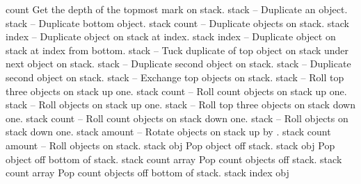 \begin{longtable}{}
	{count}
	{Get the depth of the topmost mark on stack.}
\hline
\optableent
	{stack}
	{{\bf {}}}
	{--}
	{Duplicate an object.}
\hline
\optableent
	{stack}
	{{\bf {}}}
	{--}
	{Duplicate bottom object.}
\hline
\optableent
	{stack count}
	{{\bf {}}}
	{--}
	{Duplicate objects on stack.}
\hline
\optableent
	{stack index}
	{{\bf {}}}
	{--}
	{Duplicate object on stack at index.}
\hline
\optableent
	{stack index}
	{{\bf {}}}
	{--}
	{Duplicate object on stack at index from bottom.}
\hline
\optableent
	{stack}
	{{\bf {}}}
	{--}
	{Tuck duplicate of top object on stack under next object on stack.}
\hline
\optableent
	{stack}
	{{\bf {}}}
	{--}
	{Duplicate second object on stack.}
\hline
\optableent
	{stack}
	{{\bf {}}}
	{--}
	{Duplicate second object on stack.}
\hline
\optableent
	{stack}
	{{\bf {}}}
	{--}
	{Exchange top objects on stack.}
\hline
\optableent
	{stack}
	{{\bf {}}}
	{--}
	{Roll top three objects on stack up one.}
\hline
\optableent
	{stack count}
	{{\bf {}}}
	{--}
	{Roll count objects on stack up one.}
\hline
\optableent
	{stack}
	{{\bf {}}}
	{--}
	{Roll objects on stack up one.}
\hline
\optableent
	{stack}
	{{\bf {}}}
	{--}
	{Roll top three objects on stack down one.}
\hline
\optableent
	{stack count}
	{{\bf {}}}
	{--}
	{Roll count objects on stack down one.}
\hline
\optableent
	{stack}
	{{\bf {}}}
	{--}
	{Roll objects on stack down one.}
\hline
\optableent
	{stack amount}
	{{\bf {}}}
	{--}
	{Rotate objects on stack up by .}
\hline
\optableent
	{stack count amount}
	{{\bf {}}}
	{--}
	{Roll objects on stack.}
\hline
\optableent
	{stack}
	{{\bf {}}}
	{obj}
	{Pop object off stack.}
\hline
\optableent
	{stack}
	{{\bf {}}}
	{obj}
	{Pop object off bottom of stack.}
\hline
\optableent
	{stack count}
	{{\bf {}}}
	{array}
	{Pop count objects off stack.}
\hline
\optableent
	{stack count}
	{{\bf {}}}
	{array}
	{Pop count objects off bottom of stack.}
\hline
\optableent
	{stack index}
	{{\bf {}}}
	{obj}

\end{longtable}

